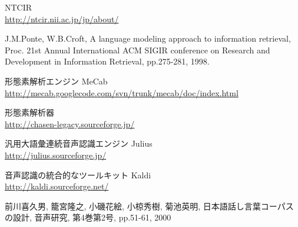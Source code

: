 \documentclass[a4paper,twocolumn,report,10.5pt]{jsbook}
\begin{document}





% 


	


\onecolumn %



\begin{thebibliography}{99} %

\renewcommand{\bibname}{参考文献}

NTCIR \\
\url{http://ntcir.nii.ac.jp/jp/about/}

J.M.Ponte, W.B.Croft, A language modeling approach to information retrieval, 
Proc. 21st Annual International ACM SIGIR conference on Research and Development in Information Retrieval, pp.275-281, 1998.

形態素解析エンジン MeCab \\
\url{http://mecab.googlecode.com/svn/trunk/mecab/doc/index.html}

形態素解析器 \\
\url{http://chasen-legacy.sourceforge.jp/}

汎用大語彙連続音声認識エンジン Julius \\
\url{http://julius.sourceforge.jp/}

音声認識の統合的なツールキット Kaldi \\
\url{http://kaldi.sourceforge.net/}

前川喜久男, 籠宮隆之, 小磯花絵, 小椋秀樹, 菊池英明, 日本語話し言葉コーパスの設計, 音声研究, 第4巻第2号, pp.51-61, 2000
                                                                                                                                                                                                                                                                                                                                                                                                                                                            



\end{thebibliography}
\end{document}
